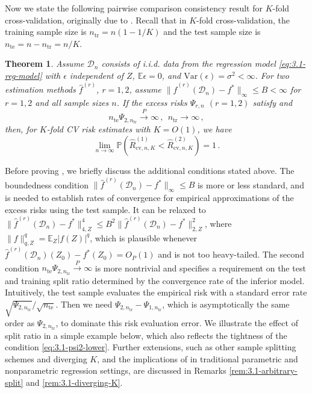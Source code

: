 \documentclass[11pt]{article}
\theoremstyle{plain}
\newtheorem{theorem}{Theorem}[section]
\newcommand{\cv}{{\mathrm{cv}}}
\newcommand{\tr}{{\mathrm{tr}}}
\newcommand{\te}{{\mathrm{te}}}
\newcommand{\D}{{\mathcal{D}}}
\newcommand{\var}{\mathrm{Var}}
\begin{document}
Now we state the following pairwise comparison consistency result for $K$-fold cross-validation, originally due to \cite{yang2007consistency}. Recall that in $K$-fold cross-validation, the training sample size is $n_\tr=n(1-1/K)$ and the test sample size is $n_\te=n-n_\tr=n/K$.  
\begin{theorem}\label{thm:3.1-yang-consistency}
Assume $\D_n$ consists of i.i.d. data from the regression model \eqref{eq:3.1-reg-model} with $\epsilon$ independent of $Z$, $\mathbb E\epsilon=0$, and ${\var}(\epsilon)=\sigma^2<\infty$.
    For two estimation methods $\hat f^{(r)}$, $r=1,2$, assume $\|\hat f^{(r)}(\D_n)-f^*\|_\infty\le B<\infty$ for $r=1,2$ and all sample sizes $n$. If the excess risks $\Psi_{r,n}$ $(r=1,2)$ satisfy  and 
   \begin{equation}\label{eq:3.1-psi2-lower}
   n_\te \Psi_{2,n_\tr}\stackrel{P}{\rightarrow}\infty\,,~~n_\tr\rightarrow\infty\,,\end{equation} 
  then, for $K$-fold CV risk estimates with $K=O(1)$, we have $$\lim_{n\rightarrow\infty}\mathbb P(\hat R^{(1)}_{\cv,n,K}<\hat R^{(2)}_{\cv,n,K})=1\,.$$
\end{theorem}

Before proving , we briefly discuss the additional conditions stated above.  The boundedness condition $\|\hat f^{(r)}(\D_n)-f^*\|_\infty\le B$ is more or less standard, and is needed to establish rates of convergence for empirical approximations of the excess risks using the test sample. It can be relaxed to $\|\hat f^{(r)}(\D_n)-f^*\|_{4,Z}^4\le B^2 \|\hat f^{(r)}(\D_n)-f^*\|_{2,Z}^2$, where $\|f\|_{q,Z}^q=\mathbb E_Z |f(Z)|^q$, which is plausible whenever $\hat f^{(r)}(\D_n)(Z_0)-f^*(Z_0)=O_P(1)$ and is not too heavy-tailed. The second condition $n_{\te}\Psi_{2,n_\tr}\stackrel{P}{\rightarrow}\infty$ is more nontrivial and specifies a requirement on the test and training split ratio determined by the convergence rate of the inferior model. Intuitively, the test sample evaluates the empirical risk with a standard error rate $\sqrt{\Psi_{2,n_\tr}}/\sqrt{n_\te}$. Then we need $\Psi_{2,n_\tr}-\Psi_{1,n_\tr}$, which is asymptotically the same order as $\Psi_{2,n_\tr}$, to dominate this risk evaluation error.  We illustrate the effect of split ratio in a simple example below, which also reflects the tightness of the condition \eqref{eq:3.1-psi2-lower}.  Further extensions, such as other sample splitting schemes and diverging $K$, and the implications of  in traditional parametric and nonparametric regression settings, are discussed in Remarks \ref{rem:3.1-arbitrary-split} and \ref{rem:3.1-diverging-K}.
\end{document}
